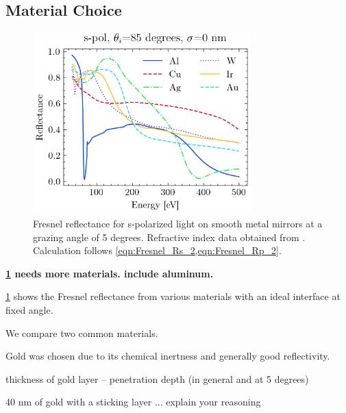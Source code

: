 \subsection{Material Choice}
\begin{figure}
	\centering
	\includegraphics[width=0.75\textwidth]{figures/chap2/Fresnel_NoSigma.png}
	\caption{Fresnel reflectance for s-polarized light on smooth metal mirrors at a grazing angle of 5 degrees. Refractive index data obtained from \cite{gulliksonCXROXRayInteractions,henkeXRayInteractionsPhotoabsorption1993}. Calculation follows \cref{eqn:Fresnel_Rs_2,eqn:Fresnel_Rp_2}.}
	\label{fig:Mirror_Material_Choice}
\end{figure}

\textbf{\cref{fig:Mirror_Material_Choice} needs more materials. include aluminum.}

\cref{fig:Mirror_Material_Choice} shows the Fresnel reflectance from various materials with an ideal interface at fixed angle.

We compare two common materials.

Gold was chosen due to its chemical inertness and generally good reflectivity.

thickness of gold layer -- penetration depth (in general and at 5 degrees)

40 nm of gold with a sticking layer ... explain your reasoning

